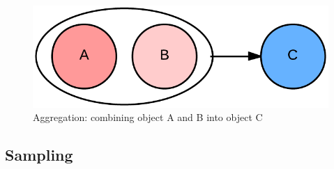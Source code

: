 		\begin{figure}[H]
			\centering
			\includegraphics[scale=0.3]{pics/aggregation.png}
			\caption{Aggregation: combining object A and B into object C}
		\end{figure}

	\subsection{Sampling}

